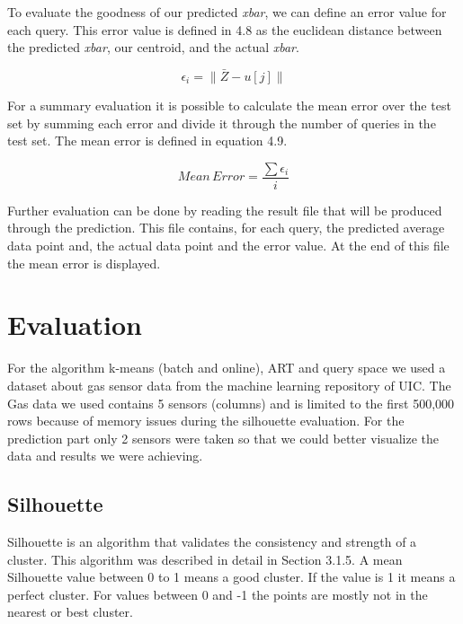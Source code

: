 \documentclass{lmproj}
\begin{document}
To evaluate the goodness of our predicted \textit{xbar}, we can define an error value for each query. This error value is defined in 4.8 as the euclidean distance between the predicted \textit{xbar}, our centroid, and the actual \textit{xbar}.

\begin{equation}
	\epsilon_i = \parallel \bar{Z} - u[j] \parallel 
\end{equation}



For a summary evaluation it is possible to calculate the mean error over the test set by summing each error and divide it through the number of queries in the test set. The mean error is defined in equation 4.9.

\begin{equation}
Mean\,Error= \frac{\sum\epsilon_i}{i}
\end{equation}



Further evaluation can be done by reading the result file that will be produced through the prediction. This file contains, for each query, the predicted average data point and, the actual data point and the error value. At the end of this file the mean error is displayed. 
\chapter{Evaluation}
For the algorithm k-means (batch and online), ART and query space we used a dataset about gas sensor data from the machine learning repository of UIC\cite{dataArchive}. The Gas data we used contains 5 sensors (columns) and is limited to the first 500,000 rows because of memory issues during the silhouette evaluation. For the prediction part only 2 sensors were taken so that we could better visualize the data and results we were achieving.

\section{Silhouette}
Silhouette is an algorithm that validates the consistency and strength of a cluster. This algorithm was described in detail in Section 3.1.5.
A mean Silhouette value between 0 to 1 means a good cluster. If the value is 1 it means a perfect cluster. For values between 0 and -1 the points are mostly not in the nearest or best cluster.
\end{document}
